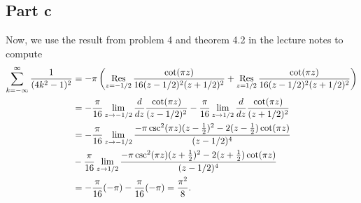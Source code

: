 \documentclass{article}
\begin{document}
\subsection{Part c}
Now, we use the result from problem 4 and theorem 4.2 in the lecture notes to compute
\begin{align*}
\sum_{k=-\infty}^\infty \frac{1}{(4k^2-1)^2}&=-\pi\left(\operatorname*{Res}_{z=-1/2}\frac{\cot(\pi z)}{16(z-1/2)^2(z+1/2)^2}+\operatorname*{Res}_{z=1/2}\frac{\cot(\pi z)}{16(z-1/2)^2(z+1/2)^2}\right)\\&=
-\frac{\pi}{16}\lim_{z\to-1/2}\frac{d}{dz}\frac{\cot(\pi z)}{(z-1/2)^2}-\frac{\pi}{16}\lim_{z\to1/2}\frac{d}{dz}\frac{\cot(\pi z)}{(z+1/2)^2}\\&=
-\frac{\pi}{16}\lim_{z\to-1/2}\frac{-\pi\csc^2(\pi z)(z-\frac{1}{2})^2-2(z-\frac{1}{2})\cot(\pi z)}{(z-1/2)^4}\\&-\frac{\pi}{16}\lim_{z\to1/2}\frac{-\pi\csc^2(\pi z)(z+\frac{1}{2})^2-2(z+\frac{1}{2})\cot(\pi z)}{(z-1/2)^4}\\&=
-\frac{\pi}{16}(-\pi)-\frac{\pi}{16}(-\pi)=\frac{\pi^2}{8}.
\end{align*}
\end{document}
